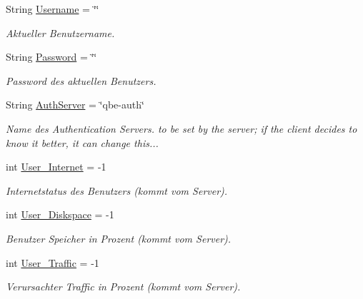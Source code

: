 \begin{CompactItemize}
\item 
String \hyperlink{classQbeSAS_1_1HttpService_1_1ServiceDataType_QbeSAS_1_1HttpService_1_1ServiceDataTypeo0}{Username} = \char`\"{}\char`\"{}
\begin{CompactList}\small\item\em Aktueller Benutzername. \item\end{CompactList}\item 
String \hyperlink{classQbeSAS_1_1HttpService_1_1ServiceDataType_QbeSAS_1_1HttpService_1_1ServiceDataTypeo1}{Password} = \char`\"{}\char`\"{}
\begin{CompactList}\small\item\em Password des aktuellen Benutzers. \item\end{CompactList}\item 
String \hyperlink{classQbeSAS_1_1HttpService_1_1ServiceDataType_QbeSAS_1_1HttpService_1_1ServiceDataTypeo2}{Auth\-Server} = \char`\"{}qbe-auth\char`\"{}
\begin{CompactList}\small\item\em Name des Authentication Servers. to be set by the server; if the client decides to know it better, it can change this... \item\end{CompactList}\item 
int \hyperlink{classQbeSAS_1_1HttpService_1_1ServiceDataType_QbeSAS_1_1HttpService_1_1ServiceDataTypeo3}{User\_\-Internet} = -1
\begin{CompactList}\small\item\em Internetstatus des Benutzers (kommt vom Server). \item\end{CompactList}\item 
int \hyperlink{classQbeSAS_1_1HttpService_1_1ServiceDataType_QbeSAS_1_1HttpService_1_1ServiceDataTypeo4}{User\_\-Diskspace} = -1
\begin{CompactList}\small\item\em Benutzer Speicher in Prozent (kommt vom Server). \item\end{CompactList}\item 
int \hyperlink{classQbeSAS_1_1HttpService_1_1ServiceDataType_QbeSAS_1_1HttpService_1_1ServiceDataTypeo5}{User\_\-Traffic} = -1
\begin{CompactList}\small\item\em Verursachter Traffic in Prozent (kommt vom Server). \item\end{CompactList}\item 

\end{CompactItemize}

